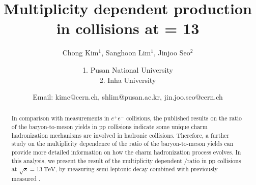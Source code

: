 \documentclass[ALICE,manyauthors]{ALICE_analysis_notes}
\begin{document}
%
 \begin{titlepage}
 \title{Multiplicity dependent \Xic production in \pp collisions at \s = 13 \TeV}
 \author{Chong Kim$^{1}$, Sanghoon Lim$^{1}$, Jinjoo Seo$^{2}$}
 \author{1. Pusan National University\\ 2. Inha University}
 \author{Email: kimc@cern.ch, shlim@pusan.ac.kr, jin.joo.seo@cern.ch}
  \begin{abstract}
  In comparison with measurements in $e^{+}e^{-}$ collisions, the published results on the ratio of the baryon-to-meson yields in pp collisions indicate some unique charm hadronization mechanisms are involved in hadronic collisions.
  Therefore, a further study on the multiplicity dependence of the ratio of the baryon-to-meson yields can provide more detailed information on how the charm hadronization process evolves.
  In this analysis, we present the result of the multiplicity dependent \Xic/\Dzero ratio in pp collisions at $\sqrt{s}=13~\mathrm{TeV}$, by measuring semi-leptonic decay \Xic combined with previously measured \Dzero.
  \end{abstract}
 \end{titlepage}
%
\tableofcontents
\clearpage
%
 \clearpage
 \clearpage
 \clearpage
 \clearpage
 \clearpage
%


\end{document}

